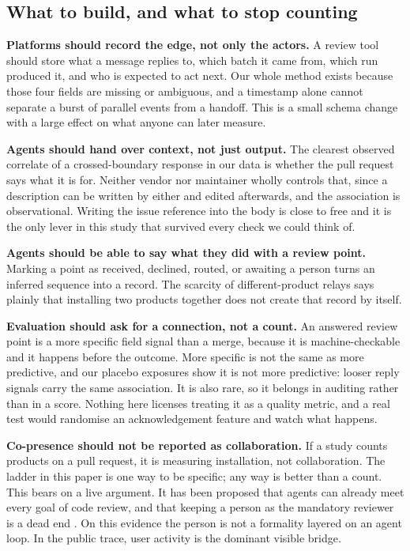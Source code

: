 \documentclass[lineno,pdflatex,sn-basic]{sn-jnl}
\begin{document}
\subsection{What to build, and what to stop counting}

\textbf{Platforms should record the edge, not only the actors.} A review tool
should store what a message replies to, which batch it came from, which run
produced it, and who is expected to act next. Our whole method exists because
those four fields are missing or ambiguous, and a timestamp alone cannot
separate a burst of parallel events from a handoff. This is a small schema
change with a large effect on what anyone can later measure.

\textbf{Agents should hand over context, not just output.} The clearest observed correlate of a crossed-boundary response in our data is
whether the pull request says what it is for. Neither vendor nor maintainer
wholly controls that, since a description can be written by either and edited
afterwards, and the association is observational. Writing the issue reference into the body is close to free
and it is the only lever in this study that survived every check we could think
of.

\textbf{Agents should be able to say what they did with a review point.} Marking
a point as received, declined, routed, or awaiting a person turns an inferred
sequence into a record. The scarcity of different-product relays says plainly
that installing two products together does not create that record by itself.

\textbf{Evaluation should ask for a connection, not a count.} An answered review point is a more specific field signal than a merge, because it
is machine-checkable and it happens before the outcome. More specific is not the
same as more predictive, and our placebo exposures show it is not more
predictive: looser reply signals carry the same association. It is also rare, so it
belongs in auditing rather than in a score. Nothing here licenses treating it as
a quality metric, and a real test would randomise an acknowledgement feature and
watch what happens.

\textbf{Co-presence should not be reported as collaboration.} If a study counts
products on a pull request, it is measuring installation, not collaboration. The
ladder in this paper is one way to be specific; any way is better than a count.
This bears on a live argument. It has been proposed that agents can already meet
every goal of code review, and that keeping a person as the mandatory reviewer is
a dead end \citep{monperrus2026endofreview}. On this evidence the person is not a
formality layered on an agent loop. In the public trace, user activity is the dominant visible bridge.
\end{document}
